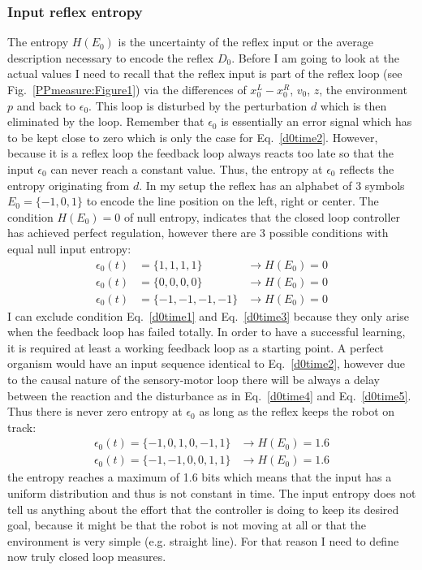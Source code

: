 \subsubsection{Input reflex entropy}
The entropy $H(E_0)$ is the uncertainty of the reflex input or the
average description necessary to encode the reflex $D_{0}$. Before
I am going to look at the actual values I need to recall that
the reflex input is part of the reflex loop (see Fig.~\ref{PPmeasure:Figure1})
via the differences of $x_0^L-x_0^R$, 
$v_0$, $z$, the environment $p$ and back to $\epsilon_0$. This
loop is disturbed by the perturbation $d$ which is then eliminated
by the loop. Remember that $\epsilon_0$ is essentially an error signal which has to be
kept close to zero which is only the case for Eq.~\ref{d0time2}.
However, because it is a reflex loop the feedback
loop always reacts too late so that the input $\epsilon_0$ can never
reach a constant value. Thus, the entropy at $\epsilon_0$ reflects the
entropy originating from $d$. In my
setup the reflex has an alphabet of 3 symbols $E_0=\{-1,0,1\}$ to
encode the line position on the left, right or center. The condition
$H(E_0)=0$ of null entropy, indicates that the closed loop controller
has achieved perfect regulation, however there are 3 possible
conditions with equal null input entropy:
\begin{eqnarray}
\epsilon_{0}(t) & = \{1 ,1, 1, 1\} & \rightarrow H(E_0)=0 \label{d0time1} \\
\epsilon_{0}(t) & = \{0, 0, 0, 0\} & \rightarrow H(E_0)=0 \label{d0time2} \\
\epsilon_{0}(t) & = \{-1, -1, -1, -1\} & \rightarrow H(E_0)=0 \label{d0time3}
\end{eqnarray}
I can exclude condition Eq.~\ref{d0time1} and Eq.~\ref{d0time3} because
they only arise when the feedback loop has failed totally.
In order to have a successful learning, it is required at least a working feedback 
loop \citep{RadicalConstruct} as a starting point.
A perfect organism would have an input sequence identical to Eq.~\ref{d0time2},
 however due to the causal nature of the sensory-motor loop there will be always a 
delay between the reaction and the disturbance as in  Eq.~\ref{d0time4} and Eq.~\ref{d0time5}.
Thus there is never  zero entropy at $\epsilon_0$ as long as the reflex keeps the robot on track:
\begin{eqnarray}
\epsilon_0(t)=\{-1, 0, 1, 0, -1, 1\} &\rightarrow  H(E_0)=1.6\label{d0time4}\\
\epsilon_0(t)=\{-1, -1, 0, 0 ,1, 1\} &\rightarrow  H(E_0)=1.6\label{d0time5}
\end{eqnarray}
the entropy reaches a maximum of 1.6 bits which means that the input
has a uniform distribution and thus is not constant in time. The
input entropy does not tell us anything about the effort that the
controller is doing to keep its desired goal, because it might be that
the robot is not moving at all or that the environment is very
simple (e.g. straight line). For that reason I need to define
now truly closed loop measures.


